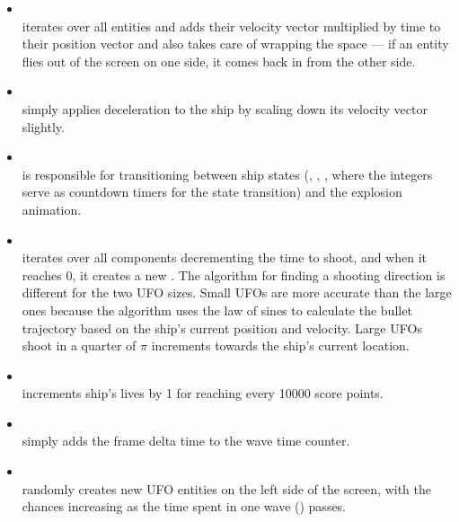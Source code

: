 \documentclass[
  digital, %
  color,   %
  table,   %
  oneside, %
  lof,     %
  lot,     %
]{fithesis3}
\begin{document}
\begin{itemize}[\textendash]
    \item  {}\\
    iterates over all entities and adds their velocity vector multiplied
    by time  to their position vector and also takes care
    of wrapping the space --- if an entity flies out of the screen on one side,
    it comes back in from the other side.

    \item {}\\
    simply applies deceleration to the ship by scaling down its velocity vector slightly.

    \item {}\\
    is responsible for transitioning between ship states
    (, , ,
    where the integers serve as countdown timers for the state transition)
    and the explosion animation.

    \item {}\\
    iterates over all  components decrementing the time to
    shoot, and when it reaches 0, it creates a new .
    The algorithm for finding a shooting direction is different for the two UFO sizes.
    Small UFOs are more accurate than the large ones because the algorithm uses
    the law of sines to calculate the bullet trajectory based on the ship's current
    position and velocity. Large UFOs shoot in a quarter of $\pi$ increments
    towards the ship's current location.

    \item {}\\
    increments ship's lives by 1 for reaching every 10\thinspace{}000 score points.

    \item {}\\
    simply adds the frame delta time  to the wave time counter.

    \item {}\\
    randomly creates new UFO entities on the left side of the screen,
    with the chances increasing as the time spent in one wave () passes.


\end{itemize}
\end{document}
